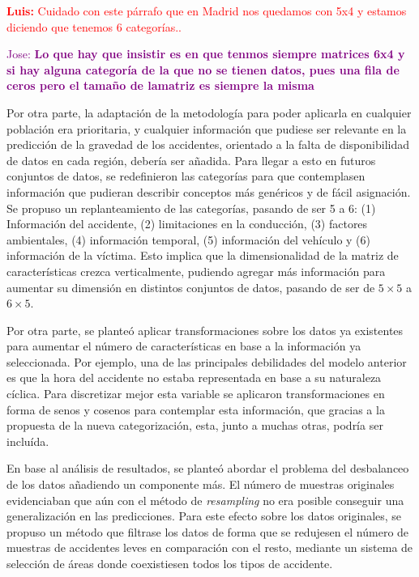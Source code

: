 \documentclass{uathesis-es}
\begin{document}
{\textcolor{red}{\textbf{Luis: } Cuidado con este párrafo que en Madrid nos quedamos con 5x4 y estamos diciendo que tenemos 6 categorías..}

\textcolor{purple}{Jose: \textbf{Lo que hay que insistir es en que tenmos siempre matrices 6x4 y si hay alguna categoría de la que no se tienen datos, pues una fila de ceros pero el tamaño de lamatriz es siempre la misma}}

Por otra parte, la adaptación de la metodología para poder aplicarla en cualquier población era prioritaria, y cualquier información que pudiese ser relevante en la predicción de la gravedad de los accidentes, orientado a la falta de disponibilidad de datos en cada región, debería ser añadida. Para llegar a esto en futuros conjuntos de datos, se redefinieron las categorías para que contemplasen información que pudieran describir conceptos más genéricos y de fácil asignación. Se propuso un replanteamiento de las categorías, pasando de ser 5 a 6: (1) Información del accidente, (2) limitaciones en la conducción, (3) factores ambientales, (4) información temporal, (5) información del vehículo y (6) información de la víctima. Esto implica que la dimensionalidad de la matriz de características crezca verticalmente, pudiendo agregar más información para aumentar su dimensión en distintos conjuntos de datos, pasando de ser de $5 \times 5$ a $6 \times 5$.

Por otra parte, se planteó aplicar transformaciones sobre los datos ya existentes para aumentar el número de características en base a la información ya seleccionada. Por ejemplo, una de las principales debilidades del modelo anterior es que la hora del accidente no estaba representada en base a su naturaleza cíclica. Para discretizar mejor esta variable se aplicaron transformaciones en forma de senos y cosenos para contemplar esta información, que gracias a la propuesta de la nueva categorización, esta, junto a muchas otras, podría ser incluída.

En base al análisis de resultados, se planteó abordar el problema del desbalanceo de los datos añadiendo un componente más. El número de muestras originales evidenciaban que aún con el método de \textit{resampling} no era posible conseguir una generalización en las predicciones. Para este efecto sobre los datos originales, se propuso un método que filtrase los datos de forma que se redujesen el número de muestras de accidentes leves en comparación con el resto, mediante un sistema de selección de áreas donde coexistiesen todos los tipos de accidente.

}
\end{document}

